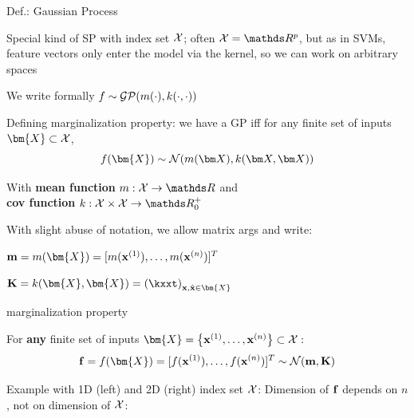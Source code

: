 \documentclass[11pt,compress,t,notes=noshow, xcolor=table]{beamer}
\begin{document}

\begin{framei}[sep=M]{Def.: Gaussian Process ~~ 
}
\item Special kind of SP with index set $\mathcal{X}$; often $\Xspace = \R^p$, but as in SVMs, feature vectors only enter the model via the kernel, so we can work on arbitrary spaces
\item We write formally $f \sim \mathcal{GP}(m(\cdot), k(\cdot, \cdot))$ %

\item Defining marginalization property: we have a GP 
iff for any finite set of inputs $\bm{X} \subset \Xspace$, 
$$
f(\bm{X}) \sim \normal(\mX, \kXX)
$$
\item With \textbf{mean function} $m: \Xspace \rightarrow \R$ and \\
\textbf{cov function} $k: \Xspace \times \Xspace \rightarrow \R^+_0$
\item With slight abuse of notation, we allow matrix args and write:
\vfill
\begin{itemizeM}
\item $\mv = m(\bm{X}) = [m(\xi[1]), \dots, m(\xi[n])]^T$
\item $\Kmat = k(\bm{X}, \bm{X}) = \left(\kxxt \right)_{\xv, \xtil \in \bm{X}}$
\end{itemizeM}

\end{framei}

\begin{framei}[sep=M]{marginalization property}
\item For \textbf{any} finite set of inputs $\bm{X} = \xdat \subset \Xspace:$
    $$
      \fv = f(\bm{X}) = \fvec^T \sim \Nmk
    $$ 


\item Example with 1D (left) and 2D (right) index set $\mathcal{X}$: Dimension of $\mathbf{f}$ depends on $n$, not on dimension of $\mathcal{X}$:
\vfill

\end{framei}
\end{document}
